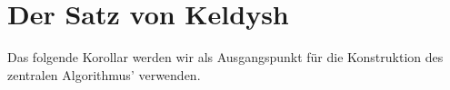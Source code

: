 \section{Der Satz von Keldysh}









Das folgende Korollar werden wir als Ausgangspunkt für die Konstruktion des zentralen Algorithmus' verwenden.



